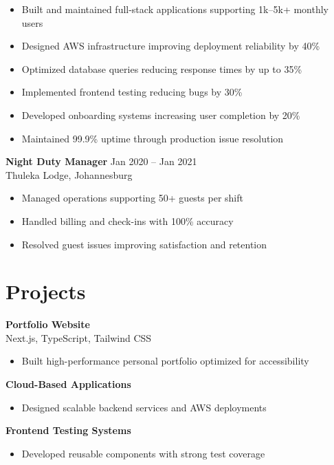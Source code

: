 \documentclass[10pt]{article}
\begin{document}
\begin{itemize}[leftmargin=*]
\item Built and maintained full-stack applications supporting 1k--5k+ monthly users
\item Designed AWS infrastructure improving deployment reliability by 40\%
\item Optimized database queries reducing response times by up to 35\%
\item Implemented frontend testing reducing bugs by 30\%
\item Developed onboarding systems increasing user completion by 20\%
\item Maintained 99.9\% uptime through production issue resolution
\end{itemize}

\vspace{6pt}

\textbf{Night Duty Manager} \hfill Jan 2020 -- Jan 2021 \\
Thuleka Lodge, Johannesburg

\begin{itemize}[leftmargin=*]
\item Managed operations supporting 50+ guests per shift
\item Handled billing and check-ins with 100\% accuracy
\item Resolved guest issues improving satisfaction and retention
\end{itemize}

\section{Projects}

\textbf{Portfolio Website} \\
Next.js, TypeScript, Tailwind CSS \\
\begin{itemize}[leftmargin=*]
\item Built high-performance personal portfolio optimized for accessibility
\end{itemize}

\textbf{Cloud-Based Applications}
\begin{itemize}[leftmargin=*]
\item Designed scalable backend services and AWS deployments
\end{itemize}

\textbf{Frontend Testing Systems}
\begin{itemize}[leftmargin=*]
\item Developed reusable components with strong test coverage
\end{itemize}
\end{document}

